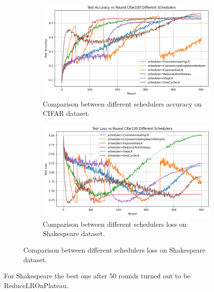 \documentclass[10pt,twocolumn,letterpaper]{article}
\begin{document}
 \begin{figure}[H]
    \centering
    \begin{subfigure}{0.48\linewidth}
        \centering
        \includegraphics[width=\linewidth]{images/graph_cifar.png}



        \caption{Comparison between different schedulers accuracy on CIFAR dataset.}


        \label{fig:short-a}
    \end{subfigure}
    \hfill
    \begin{subfigure}{0.48\linewidth}
        \centering
        \includegraphics[width=\linewidth]{images/cifar_loss.png}

        \caption{Comparison between different schedulers loss on Shakespeare dataset.}

        \label{fig:short-b}
    \end{subfigure}
    
    \label{fig:cifarBaseline}
\end{figure}

For Shakespeare the best one after 50 rounds turned out to be ReduceLROnPlateau.
\end{document}
